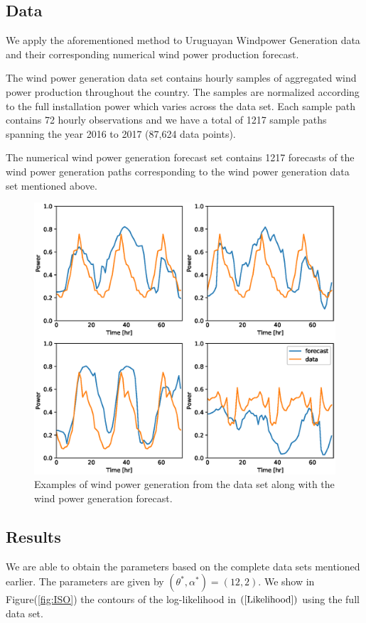 \documentclass[10pt,twocolumn,letterpaper]{article}
\begin{document}
\subsection{Data}
We apply the aforementioned method to Uruguayan Windpower Generation data and their corresponding numerical wind power production forecast. 

The wind power generation data set contains hourly samples of aggregated wind power production throughout the country. The samples are normalized according to the full installation power which varies across the data set. Each sample path contains 72 hourly observations and we have a total of 1217 sample paths spanning the year 2016 to 2017 (87,624 data points).

The numerical wind power generation forecast set contains  1217 forecasts of the wind power generation paths corresponding to the wind power generation data set mentioned above.


\begin{figure}[t]
\begin{center}
   \includegraphics[width=0.8\linewidth]{forecast_data.eps}
\end{center}
   \caption{Examples of wind power generation from the data set along with the wind power generation forecast.}
\label{fig:long}
\label{fig:onecol}
\end{figure}




\subsection{Results}
 We are able to obtain the parameters based on the complete data sets mentioned earlier. The parameters are given by $(\theta^*, \alpha^*)= (12,2)$. We show in Figure(\ref{fig:ISO}) the contours of the log-likelihood in $(\ref{Likelihood})$ using the full data set.
 
\end{document}
